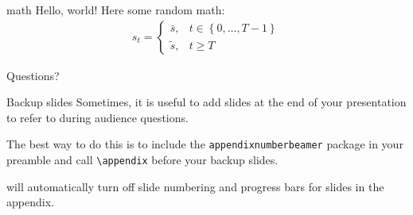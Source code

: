 \documentclass[aspectratio=169]{beamer}
\begin{document}
\begin{frame}{math}
 Hello, world! Here some random math:
 \begin{align*}
 s_{t}=\begin{cases}
 \bar{s}, & t\in \left\lbrace 0,\dots, T-1\right\rbrace  \\
 \tilde{s}, & t\geq T
 \end{cases}
 \end{align*} 
\end{frame}

{
\begin{frame}[standout]
  Questions?
\end{frame}
}

\appendix

\begin{frame}[fragile]{Backup slides}
  Sometimes, it is useful to add slides at the end of your presentation to
  refer to during audience questions.

  The best way to do this is to include the \verb|appendixnumberbeamer|
  package in your preamble and call \verb|\appendix| before your backup slides.

  \themename will automatically turn off slide numbering and progress bars for
  slides in the appendix.
\end{frame}
\end{document}
